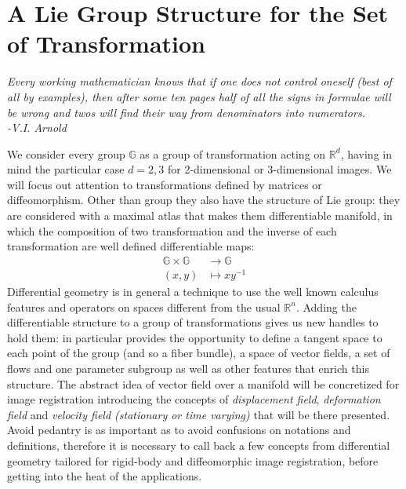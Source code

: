 
\chapter{A Lie Group Structure for the Set of Transformation}\label{ch:finite_lie_group}


\begin{flushright}
	\emph{Every working mathematician knows that if one does not control oneself (best of all by examples), then after some ten pages half of all the signs in formulae will be wrong and twos will find their way from denominators into numerators. \\ -V.I. Arnold}
\end{flushright}

We consider every group $\mathbb{G}$ as a group of transformation acting on $\mathbb{R}^{d}$, having in mind the particular case $d=2,3$ for 2-dimensional or 3-dimensional images.
We will focus out attention to transformations defined by matrices or diffeomorphism. Other than group they also have the structure of Lie group: they are considered with a maximal atlas that makes them differentiable manifold, in which the composition of two transformation and the inverse of each transformation are well defined differentiable maps:
\begin{align*}
\mathbb{G} \times \mathbb{G} & \longrightarrow  \mathbb{G}    \\
(x,y) &\longmapsto  x y^{-1}
\end{align*}
 Differential geometry is in general a technique to use the well known calculus features and operators on spaces different from the usual $\mathbb{R}^{n}$. Adding the differentiable structure to a group of transformations gives us new handles to hold them: in particular provides the opportunity to define a tangent space to each point of the group (and so a fiber bundle), a space of vector fields, a set of flows and one parameter subgroup as well as other features that enrich this structure. The abstract idea of vector field over a manifold will be concretized for image registration introducing the concepts of \emph{displacement field}, \emph{deformation field} and \emph{velocity field (stationary or time varying)} that will be there presented. Avoid pedantry is as important as to avoid confusions on notations and definitions, therefore it is necessary to call back a few concepts from differential geometry tailored for rigid-body and diffeomorphic image registration, before getting into the heat of the applications. 

